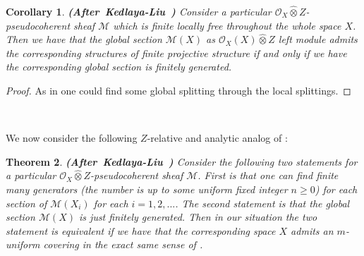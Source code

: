 \documentclass[12pt]{amsart}
\newtheorem{theorem}{Theorem}[section]
\newtheorem{corollary}[theorem]{Corollary}
\theoremstyle{definition}
\numberwithin{equation}{section}
\begin{document}
\begin{corollary}  \mbox{\bf{(After Kedlaya-Liu \cite[Corollary 2.6.8]{KL2})}}
Consider a particular $\mathcal{O}_X\widehat{\otimes}Z$-pseudocoherent sheaf $\mathcal{M}$ which is finite locally free throughout the whole space $X$. Then we have that the global section $\mathcal{M}(X)$ as $\mathcal{O}_X(X)\widehat{\otimes}Z$ left module admits the corresponding structures of finite projective structure if and only if we have the corresponding global section is finitely generated.
\end{corollary}

\begin{proof}
As in \cite[Corollary 2.6.8]{KL2} one could find some global splitting through the local splittings.
\end{proof}

\

\indent We now consider the following $Z$-relative and analytic analog of \cite[Proposition 2.6.17]{KL2}:

\begin{theorem} \mbox{\bf{(After Kedlaya-Liu \cite[Proposition 2.6.17]{KL2})}} \label{theorem6.31}
Consider the following two statements for a particular $\mathcal{O}_X\widehat{\otimes}Z$-pseudocoherent sheaf $\mathcal{M}$. First is that one can find finite many generators (the number is up to some uniform fixed integer $n\geq 0$) for each section of $\mathcal{M}(X_i)$ for each $i=1,2,...$. The second statement is that the global section $\mathcal{M}(X)$ is just finitely generated. Then in our situation the two statement is equivalent if we have that the corresponding space $X$ admits an $m$-uniform covering in the exact same sense of \cite[Proposition 2.6.17]{KL2}. 	
\end{theorem}
\end{document}
